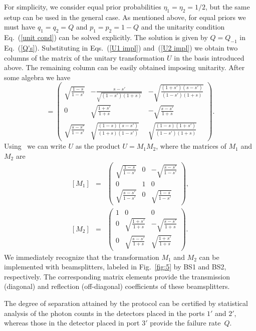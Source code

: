 \documentclass[aps,pra,twocolumn,showpacs]{revtex4-1}
\begin{document}
{For simplicity, we consider equal prior probabilities $\eta_1=\eta_2=1/2$, but the same setup can be used in the general case. As mentioned above, for equal priors we must have $q_1=q_2=Q$ and $p_1=p_2=1-Q$ and the unitarity condition Eq.~(\ref{unit cond}) can be solved explicitly. The solution is given by $Q=Q_{-1}$ in Eq.~(\ref{Q's}). Substituting in Eqs.~(\ref{U1 impl}) and~(\ref{U2 impl}) we obtain two columns of the matrix of the unitary transformation $U$ in the basis introduced above. The remaining  column can be easily obtained imposing unitarity. After some algebra we have
%
\begin{equation}
[U]=\begin{pmatrix}\sqrt{\frac{1-s}{1-s'}} & -\frac{s-s'}{\sqrt{(1-s')(1+s)}} & -\sqrt{\frac{(1+s')(s-s')}{(1-s')(1+s)}}\\[.7em]
0 & \sqrt{\frac{1+s'}{1+s}} & -\sqrt{\frac{s-s'}{1+s}}\\[.7em]
\sqrt{\frac{s-s'}{1-s'}} & \sqrt{\frac{(1-s)(s-s')}{(1+s)(1-s')}} & \sqrt{\frac{(1-s)(1+s')}{(1-s')(1+s)}}
\end{pmatrix}.
\end{equation}
%
Using~\cite{reck,BergouImp} we can write $U$ as the product $U=M_1 M_2$, where the matrices of $M_1$ and $M_2$  are
%
\begin{eqnarray}
{}[M_1]&=&\begin{pmatrix}\sqrt{\frac{1-s}{1-s'}} & 0 & -\sqrt{\frac{s-s'}{1-s'}}\\
0 & 1 & 0\\
\sqrt{\frac{s-s'}{1-s'}} & 0 & \sqrt{\frac{1-s}{1-s'}}
\end{pmatrix},\label{M1}\\[1em]
{}[M_2]&=&
\begin{pmatrix}1 & 0 & 0\\
0 & \sqrt{\frac{1+s'}{1+s}} & -\sqrt{\frac{s-s'}{1+s}}\\
0 & \sqrt{\frac{s-s'}{1+s}} & \sqrt{\frac{1+s'}{1+s}}
\end{pmatrix}.
\label{M2}
\end{eqnarray}
%
We immediately recognize that the transformation $M_1$ and $M_2$ can be implemented with beamsplitters, labeled in Fig.~\ref{fig:5} by  BS1 and BS2, respectively. The corresponding matrix elements provide the transmission (diagonal) and reflection  (off-diagonal) coefficients of these beamsplitters.

The degree of separation attained by the protocol can be certified by statistical analysis of the photon counts in the detectors placed in the ports $1'$ and $2'$, whereas those in the detector placed in port $3'$ provide the failure rate~$Q$. 

}
\end{document}
